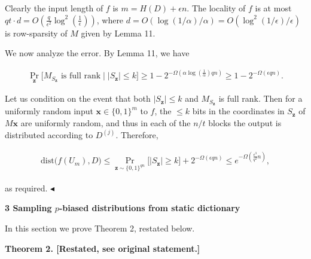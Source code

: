 \documentclass[10pt,a4paper]{article}
\begin{document}
Clearly the input length of $f$ is $m=H(D)+\epsilon n$.
The locality of $f$ is at most $qt\cdot d=O(\frac{q}{\epsilon^{2}}\log^{2}\left(\frac{1}{\epsilon}\right))$, where $d=O(\log(1/\alpha)/\alpha)=O(\log^{2}(1/\epsilon)/\epsilon)$ is row-sparsity of $M$ given by Lemma 11.\par




We now analyze the error.
By Lemma 11, we have\par


\[\begin{gathered}
\displaystyle\Pr_{\boldsymbol{z}}\bigl[\text{$M_{S_{\boldsymbol{z}}}$ is full rank}\mid\lvert S_{\boldsymbol{z}}\rvert\leq k\bigr]\geq 1-2^{-\Omega(\alpha\log(\frac{1}{\alpha})qn)}\geq 1-2^{-\Omega(\epsilon qn)}.
\end{gathered}\]




Let us condition on the event that both $\lvert S_{\boldsymbol{z}}\rvert\leq k$ and $M_{S_{\boldsymbol{z}}}$ is full rank.
Then for a uniformly random input $\boldsymbol{x}\in\{0,1\}^{m}$ to $f$, the $\leq k$ bits in the coordinates in $S_{\boldsymbol{z}}$ of $M\boldsymbol{x}$ are uniformly random, and thus in each of the $n/t$ blocks the output is distributed according to $D^{(j)}$. Therefore,\par


\[\begin{gathered}
\displaystyle\mathrm{dist}\bigl(f(U_{m}),D\bigr)\leq\Pr_{\boldsymbol{z}\sim\{0,1\}^{qn}}\bigl[\lvert S_{\boldsymbol{z}}\rvert\geq k\bigr]+2^{-\Omega(\epsilon qn)}\leq e^{-\Omega(\frac{\epsilon^{3}}{q^{2}}n)},
\end{gathered}\]


as required.
$\blacktriangleleft$\par






\par\medskip\noindent\textbf{
3 Sampling $p$-biased distributions from static dictionary}\par




In this section we prove Theorem 2, restated below.\par






\par\medskip\noindent\textbf{
\textbf{Theorem 2}\textbf{.}
[Restated, see original statement.]}\par
\end{document}
